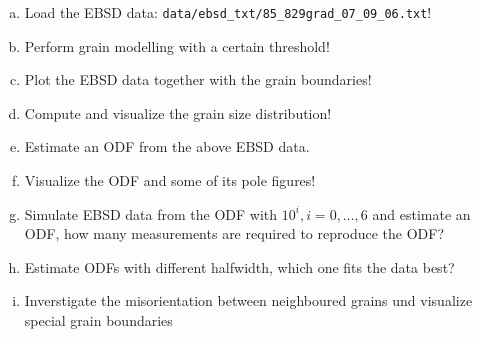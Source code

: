 \begin{frame}

  \begin{Exercise}
    \begin{enumerate}[a)]
    \item Load the EBSD data:
      \texttt{data/ebsd\_txt/85\_829grad\_07\_09\_06.txt}!
    \item Perform grain modelling with a certain threshold!
    \item Plot the  EBSD data together with the grain boundaries!
    \item Compute and visualize the grain size distribution!
    \item Estimate an ODF from the above EBSD data.
    \item Visualize the ODF and some of its pole figures!
		\item Simulate EBSD data from the ODF with $10^i, i=0,\dots,6$ and estimate an ODF, how many measurements are required to reproduce the ODF?
		\item Estimate ODFs with different halfwidth, which one fits the data best?
    \item Inverstigate the misorientation between neighboured grains und visualize special grain boundaries
    \end{enumerate}
  \end{Exercise}


\end{frame}
%
%
